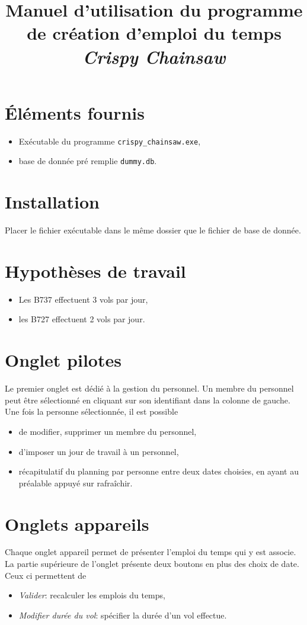 \documentclass{scrartcl}
\title{Manuel d'utilisation du programme de création d'emploi du temps
\emph{Crispy Chainsaw}}
\author{}
\date{}
\begin{document}
\maketitle

\section{Éléments fournis}
\begin{itemize}
  \item Exécutable du programme \texttt{crispy\_chainsaw.exe},
  \item base de donnée pré remplie \texttt{dummy.db}.
\end{itemize}

\section{Installation}
Placer le fichier exécutable dans le même dossier que le fichier de base de
donnée.

\section{Hypothèses de travail}
\begin{itemize}
  \item Les B737 effectuent 3 vols par jour,
  \item les B727 effectuent 2 vols par jour.
\end{itemize}

\section{Onglet pilotes}
Le premier onglet est dédié à la gestion du personnel. Un membre du personnel
peut être sélectionné en cliquant sur son identifiant dans la colonne de gauche.
Une fois la personne sélectionnée, il est possible
\begin{itemize}
  \item de modifier, supprimer un membre du personnel,
  \item d'imposer un jour de travail à un personnel,
  \item récapitulatif du planning par personne entre deux dates choisies, en
    ayant au préalable appuyé sur rafraîchir.
\end{itemize}

\section{Onglets appareils}
Chaque onglet appareil permet de présenter l'emploi du temps qui y est associe.
La partie supérieure de l'onglet présente deux boutons en plus des choix de
date. Ceux ci permettent de
\begin{itemize}
  \item \emph{Valider}: recalculer les emplois du temps,
  \item \emph{Modifier durée du vol}: spécifier la durée d'un vol effectue.
\end{itemize}
\end{document}
